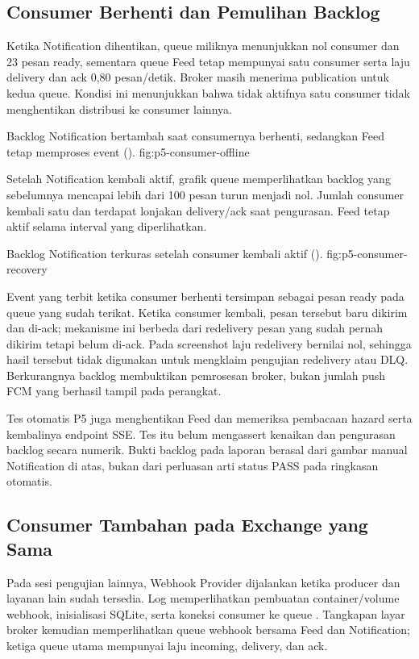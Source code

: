 \subsection{Consumer Berhenti dan Pemulihan Backlog}

Ketika Notification dihentikan, queue miliknya menunjukkan nol consumer
dan 23 pesan ready, sementara queue Feed tetap mempunyai satu consumer
serta laju delivery dan ack 0,80 pesan/detik. Broker masih menerima
publication untuk kedua queue. Kondisi ini menunjukkan bahwa tidak
aktifnya satu consumer tidak menghentikan distribusi ke consumer lainnya.

{Backlog Notification bertambah saat consumernya berhenti, sedangkan Feed tetap memproses event ().}
{fig:p5-consumer-offline}

Setelah Notification kembali aktif, grafik queue memperlihatkan backlog
yang sebelumnya mencapai lebih dari 100 pesan turun menjadi nol. Jumlah
consumer kembali satu dan terdapat lonjakan delivery/ack saat pengurasan.
Feed tetap aktif selama interval yang diperlihatkan.

{Backlog Notification terkuras setelah consumer kembali aktif ().}
{fig:p5-consumer-recovery}

Event yang terbit ketika consumer berhenti tersimpan sebagai pesan ready
pada queue yang sudah terikat. Ketika consumer kembali, pesan tersebut
baru dikirim dan di-ack; mekanisme ini berbeda dari redelivery pesan yang
sudah pernah dikirim tetapi belum di-ack. Pada screenshot laju redelivery
bernilai nol, sehingga hasil tersebut tidak digunakan untuk mengklaim
pengujian redelivery atau DLQ. Berkurangnya backlog membuktikan pemrosesan
broker, bukan jumlah push FCM yang berhasil tampil pada perangkat.

Tes otomatis P5 juga menghentikan Feed dan memeriksa pembacaan hazard
serta kembalinya endpoint SSE. Tes itu belum mengassert kenaikan dan
pengurasan backlog secara numerik. Bukti backlog pada laporan berasal
dari gambar manual Notification di atas, bukan dari perluasan arti status
PASS pada ringkasan otomatis.

\subsection{Consumer Tambahan pada Exchange yang Sama}

Pada sesi pengujian lainnya, Webhook Provider dijalankan ketika producer
dan layanan lain sudah tersedia. Log  memperlihatkan
pembuatan container/volume webhook, inisialisasi SQLite, serta koneksi
consumer ke queue . Tangkapan layar broker
kemudian memperlihatkan queue webhook bersama Feed dan Notification;
ketiga queue utama mempunyai laju incoming, delivery, dan ack.

